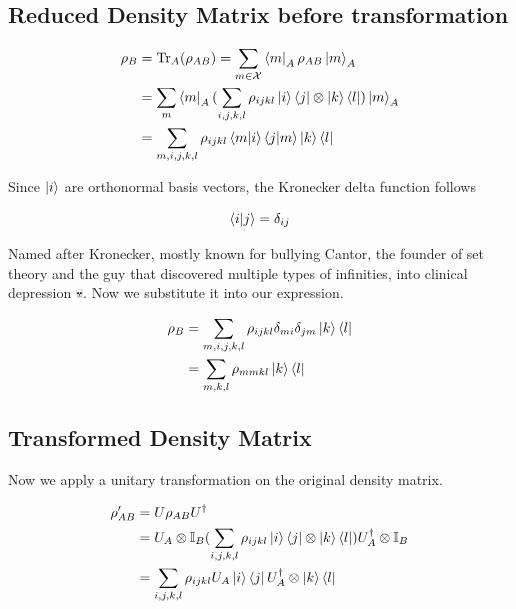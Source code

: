\documentclass[11pt,a4paper]{article}
\newcommand{\emoji}[1]{{\EmojiFont #1}}
\begin{document}
\subsection{Reduced Density Matrix before transformation}

\begin{align}
  \rho_{B} &= \mathrm{Tr}_{A}(\rho_{AB}) = \sum_{m \in \mathcal{X}} \bra{m}_A\rho_{AB}\ket{m}_A \\
           &= \sum_{m} \bra{m}_A(\sum_{i, j, k, l} \rho_{ijkl} \ket{i}\bra{j} \otimes \ket{k}\bra{l}) \ket{m}_A \\
           &= \sum_{m, i, j, k, l} \rho_{ijkl} \bra{m}\ket{i}\bra{j}\ket{m} \ket{k}\bra{l} \\
\end{align}

Since $\ket{i}$ are orthonormal basis vectors, the Kronecker delta function follows

\begin{equation}
  \bra{i}\ket{j} = \delta_{ij}
\end{equation}

Named after Kronecker, mostly known for bullying Cantor, the founder of set theory and the guy that
discovered multiple types of infinities, into clinical depression \emoji{💀}. Now we substitute it into
our expression.

\begin{align}
  \rho_{B} &= \sum_{m, i, j, k, l} \rho_{ijkl} \delta_{mi}\delta_{jm} \ket{k}\bra{l} \\
           &= \sum_{m, k, l} \rho_{mmkl} \ket{k}\bra{l}
\label{eq:rho_b_untransformed}
\end{align}

\subsection{Transformed Density Matrix}

Now we apply a unitary transformation on the original density matrix.

\begin{align}
  \rho_{AB}'
  &= U \rho_{AB} U^{\dagger} \\
  &= U_A \otimes \mathbb{I}_B (\sum_{i, j, k, l} \rho_{ijkl} \ket{i}\bra{j} \otimes \ket{k}\bra{l}) U_A^{\dagger} \otimes \mathbb{I}_B \\
  &= \sum_{i, j, k, l} \rho_{ijkl} U_A\ket{i}\bra{j}U_A^{\dagger} \otimes \ket{k}\bra{l}
\end{align}
\end{document}
